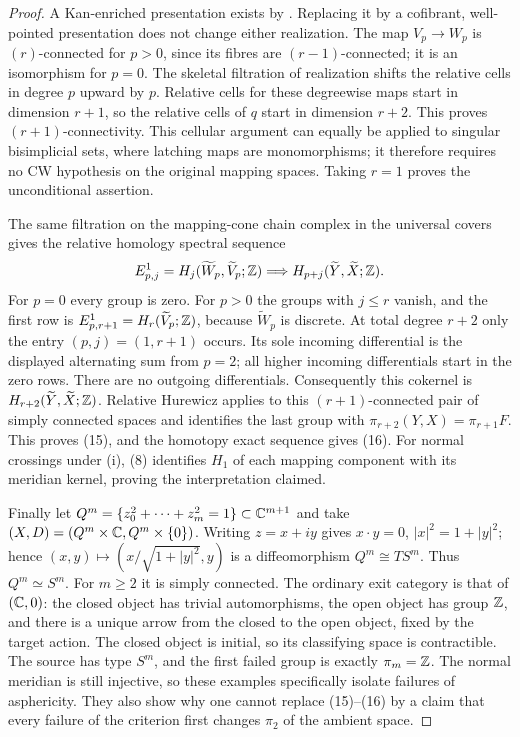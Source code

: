 \begin{proof}
A Kan-enriched presentation exists by
\citet[Theorem 2.2.5.1]{LurieHTT2009}.  Replacing it by a cofibrant,
well-pointed presentation does not change either realization.
The map $V_p\to W_p$ is $(r)$-connected for $p>0$, since its
fibres are $(r-1)$-connected; it is an isomorphism for $p=0$.
The skeletal filtration of realization shifts the relative cells
in degree $p$ upward by $p$.  Relative cells for these degreewise
maps start in dimension $r+1$, so the relative cells of $q$ start
in dimension $r+2$.  This proves $(r+1)$-connectivity.  This
cellular argument can equally be applied to singular bisimplicial
sets, where latching maps are monomorphisms; it therefore requires
no CW hypothesis on the original mapping spaces.  Taking $r=1$
proves the unconditional assertion.

The same filtration on the mapping-cone chain complex in the
universal covers gives the relative homology spectral sequence
\[
 E^1_{p,j}=H_j(\widetilde W_p,\widetilde V_p;\mathbb Z)
       \Longrightarrow H_{p+j}(\widetilde Y,\widetilde X;\mathbb Z).
\]
For $p=0$ every group is zero.  For $p>0$ the groups with
$j\leq r$ vanish, and the first row is
$E^1_{p,r+1}=H_r(\widetilde V_p;\mathbb Z)$, because
$\widetilde W_p$ is discrete.  At total degree $r+2$ only the
entry $(p,j)=(1,r+1)$ occurs.  Its sole incoming differential is
the displayed alternating sum from $p=2$; all higher incoming
differentials start in the zero rows.  There are no outgoing
differentials.  Consequently this cokernel is
$H_{r+2}(\widetilde Y,\widetilde X;\mathbb Z)$.
Relative Hurewicz applies to this $(r+1)$-connected pair of simply
connected spaces and identifies the last group with
$\pi_{r+2}(Y,X)=\pi_{r+1}F$.  This proves (15), and the homotopy
exact sequence gives (16).  For normal crossings under (i), (8)
identifies $H_1$ of each mapping component with its meridian
kernel, proving the interpretation claimed.

Finally let
$Q^m=\{z_0^2+\cdots+z_m^2=1\}\subset\mathbb C^{m+1}$ and take
$(X,D)=(Q^m\times\mathbb C,Q^m\times\{0\})$.  Writing $z=x+iy$ gives
$x\cdot y=0$, $|x|^2=1+|y|^2$; hence
$(x,y)\mapsto(x/\sqrt{1+|y|^2},y)$ is a diffeomorphism
$Q^m\cong TS^m$.  Thus $Q^m\simeq S^m$.  For $m\geq2$ it is
simply connected.  The ordinary exit category is that of
$(\mathbb C,0)$: the closed object has trivial automorphisms, the open
object has group $\mathbb Z$, and there is a unique arrow from the
closed to the open object, fixed by the target action.  The closed
object is initial, so its classifying space is contractible.
The source has type $S^m$, and the first failed group is exactly
$\pi_m=\mathbb Z$.  The normal meridian is still injective, so these
examples specifically isolate failures of asphericity.  They also
show why one cannot replace (15)--(16) by a claim that every
failure of the criterion first changes $\pi_2$ of the ambient
space.
\end{proof}

